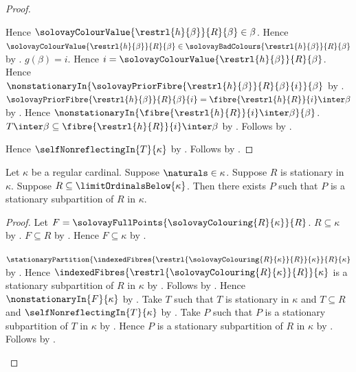 \begin{proof}
\begin{subproof}
        Hence $\solovayColourValue{\restrl{h}{\beta}}{R}{\beta}\in\beta$.
        Hence $\solovayColourValue{\restrl{h}{\beta}}{R}{\beta}
            \in\solovayBadColours{\restrl{h}{\beta}}{R}{\beta}$
            by .
        $g(\beta)=i$.
        Hence $i=\solovayColourValue{\restrl{h}{\beta}}{R}{\beta}$.
        Hence $\nonstationaryIn{
            \solovayPriorFibre{\restrl{h}{\beta}}{R}{\beta}{i}}{\beta}$
            by .
        $\solovayPriorFibre{\restrl{h}{\beta}}{R}{\beta}{i}
            =\fibre{\restrl{h}{R}}{i}\inter\beta$
            by .
        Hence $\nonstationaryIn{\fibre{\restrl{h}{R}}{i}\inter\beta}
            {\beta}$.
        $T\inter\beta\subseteq
            \fibre{\restrl{h}{R}}{i}\inter\beta$
            by .
        Follows by .
    \end{subproof}
    Hence $\selfNonreflectingIn{T}{\kappa}$
        by .
    Follows by \auto.
\end{proof}

\begin{theorem}\label{limit_point_stationary_subpartition}
    Let $\kappa$ be a regular cardinal.
    Suppose $\naturals\in\kappa$.
    Suppose $R$ is stationary in $\kappa$.
    Suppose $R\subseteq\limitOrdinalsBelow{\kappa}$.
    Then there exists $P$ such that
        $P$ is a stationary subpartition of $R$ in $\kappa$.
\end{theorem}
\begin{proof}
    Let $F=\solovayFullPoints{\solovayColouring{R}{\kappa}}{R}$.
    $R\subseteq\kappa$ by .
    $F\subseteq R$ by .
    Hence $F\subseteq\kappa$ by .
    \begin{byCase}
        $\stationaryPartition{
            \indexedFibres{\restrl{\solovayColouring{R}{\kappa}}{R}}
                {\kappa}}{R}{\kappa}$
            by .
        Hence $\indexedFibres{\restrl{\solovayColouring{R}{\kappa}}{R}}
            {\kappa}$ is a stationary subpartition of $R$ in $\kappa$
            by .
        Follows by \auto.
        Hence $\nonstationaryIn{F}{\kappa}$
            by .
        Take $T$ such that $T$ is stationary in $\kappa$ and
            $T\subseteq R$ and $\selfNonreflectingIn{T}{\kappa}$
            by .
        Take $P$ such that $P$ is a stationary subpartition of $T$ in $\kappa$
            by .
        Hence $P$ is a stationary subpartition of $R$ in $\kappa$
            by .
        Follows by \auto.
    \end{byCase}
\end{proof}

